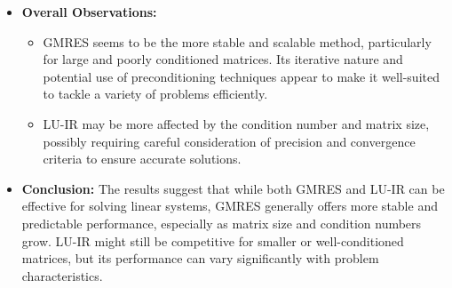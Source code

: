 \begin{itemize}
\begin{itemize}
    \end{itemize}
    \item \textbf{Overall Observations:}
    \begin{itemize}
        \item GMRES seems to be the more stable and scalable method, particularly for large and poorly conditioned matrices. Its iterative nature and potential use of preconditioning techniques appear to make it well-suited to tackle a variety of problems efficiently.
        \item LU-IR may be more affected by the condition number and matrix size, possibly requiring careful consideration of precision and convergence criteria to ensure accurate solutions.
    \end{itemize}
    \item \textbf{Conclusion:}
    The results suggest that while both GMRES and LU-IR can be effective for solving linear systems, GMRES generally offers more stable and predictable performance, especially as matrix size and condition numbers grow. LU-IR might still be competitive for smaller or well-conditioned matrices, but its performance can vary significantly with problem characteristics. 
    

\end{itemize}
\clearpage


    



    
    



    
    



    




